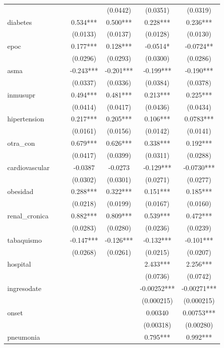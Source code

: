 \documentclass[]{article}
\begin{document}
\begin{tabular}{lcccccc}
 &  &  &  & (0.0442) & (0.0351) & (0.0319) \\
diabetes &  &  & 0.534*** & 0.500*** & 0.228*** & 0.236*** \\
 &  &  & (0.0133) & (0.0137) & (0.0128) & (0.0130) \\
epoc &  &  & 0.177*** & 0.128*** & -0.0514* & -0.0724** \\
 &  &  & (0.0296) & (0.0293) & (0.0300) & (0.0286) \\
asma &  &  & -0.243*** & -0.201*** & -0.199*** & -0.190*** \\
 &  &  & (0.0337) & (0.0336) & (0.0384) & (0.0378) \\
inmusupr &  &  & 0.494*** & 0.481*** & 0.213*** & 0.225*** \\
 &  &  & (0.0414) & (0.0417) & (0.0436) & (0.0434) \\
hipertension &  &  & 0.217*** & 0.205*** & 0.106*** & 0.0783*** \\
 &  &  & (0.0161) & (0.0156) & (0.0142) & (0.0141) \\
otra\_con &  &  & 0.679*** & 0.626*** & 0.338*** & 0.192*** \\
 &  &  & (0.0417) & (0.0399) & (0.0311) & (0.0288) \\
cardiovascular &  &  & -0.0387 & -0.0273 & -0.129*** & -0.0730*** \\
 &  &  & (0.0302) & (0.0301) & (0.0271) & (0.0277) \\
obesidad &  &  & 0.288*** & 0.322*** & 0.151*** & 0.185*** \\
 &  &  & (0.0218) & (0.0199) & (0.0167) & (0.0160) \\
renal\_cronica &  &  & 0.882*** & 0.809*** & 0.539*** & 0.472*** \\
 &  &  & (0.0283) & (0.0280) & (0.0236) & (0.0239) \\
tabaquismo &  &  & -0.147*** & -0.126*** & -0.132*** & -0.101*** \\
 &  &  & (0.0268) & (0.0261) & (0.0215) & (0.0207) \\
hospital &  &  &  &  & 2.433*** & 2.256*** \\
 &  &  &  &  & (0.0736) & (0.0742) \\
ingresodate &  &  &  &  & -0.00252*** & -0.00271*** \\
 &  &  &  &  & (0.000215) & (0.000215) \\
onset &  &  &  &  & 0.00340 & 0.00753*** \\
 &  &  &  &  & (0.00318) & (0.00280) \\
pneumonia &  &  &  &  & 0.795*** & 0.992*** \\

\end{tabular}
\end{document}
